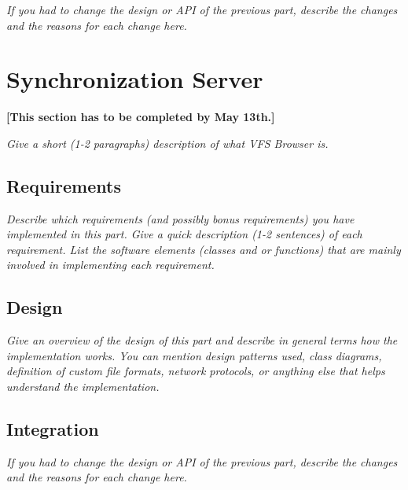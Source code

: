\documentclass[a4paper,12pt]{article}
\begin{document}
\emph{If you had to change the design or API of the previous part, describe the changes and the reasons for each change here.}




\section{Synchronization Server}

\textbf{[This section has to be completed by May 13th.]}

\emph{Give a short (1-2 paragraphs) description of what VFS Browser is.}


\subsection{Requirements}

\emph{Describe which requirements (and possibly bonus requirements) you have implemented in this part. Give a quick description (1-2 sentences) of each requirement. List the software elements (classes and or functions) that are mainly involved in implementing each requirement.}


\subsection{Design}

\emph{Give an overview of the design of this part and describe in general terms how the implementation works. You can mention design patterns used, class diagrams, definition of custom file formats, network protocols, or anything else that helps understand the implementation.}


\subsection{Integration}

\emph{If you had to change the design or API of the previous part, describe the changes and the reasons for each change here.}
\end{document}
